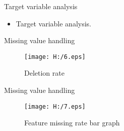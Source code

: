 \documentclass[
 size=14pt,
 paper=smartboard,  %
 mode=present, 		%
 display=slides, 	%
 style=tuliplab,  	%
 pauseslide,
 fleqn,leqno]{powerdot}
\begin{document}
\begin{slide}{Target variable analysis}
  \begin{itemize}
    \item
    Target variable analysis.
  \end{itemize}
    
  \begin{figure}
    \centering
    \quad
  
  \end{figure}
  
  \end{slide}


\begin{slide}{Missing value handling}
    
  \begin{figure}
    \texttt{[image: H:/6.eps]}
    \caption{Deletion rate}
    \label{fig:6}
  \end{figure}
  
  \end{slide}


\begin{slide}{Missing value handling}
    
  \begin{figure}
    \texttt{[image: H:/7.eps]}
    \caption{Feature missing rate bar graph}
    \label{fig:7}
  \end{figure}
  
  \end{slide}
\end{document}
